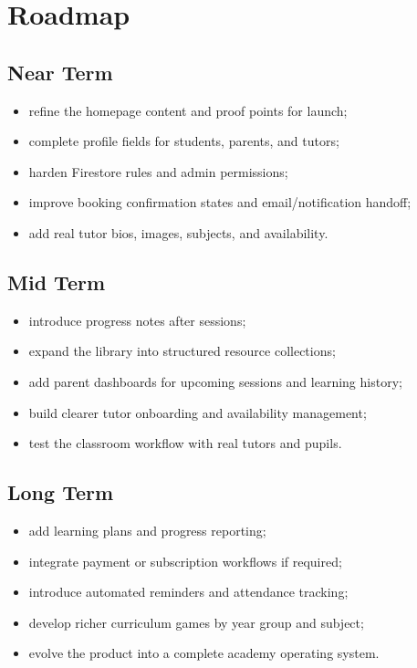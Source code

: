 \documentclass[11pt,a4paper]{article}
\begin{document}
\section{Roadmap}

\subsection{Near Term}

\begin{itemize}
    \item refine the homepage content and proof points for launch;
    \item complete profile fields for students, parents, and tutors;
    \item harden Firestore rules and admin permissions;
    \item improve booking confirmation states and email/notification handoff;
    \item add real tutor bios, images, subjects, and availability.
\end{itemize}

\subsection{Mid Term}

\begin{itemize}
    \item introduce progress notes after sessions;
    \item expand the library into structured resource collections;
    \item add parent dashboards for upcoming sessions and learning history;
    \item build clearer tutor onboarding and availability management;
    \item test the classroom workflow with real tutors and pupils.
\end{itemize}

\subsection{Long Term}

\begin{itemize}
    \item add learning plans and progress reporting;
    \item integrate payment or subscription workflows if required;
    \item introduce automated reminders and attendance tracking;
    \item develop richer curriculum games by year group and subject;
    \item evolve the product into a complete academy operating system.
\end{itemize}
\end{document}
